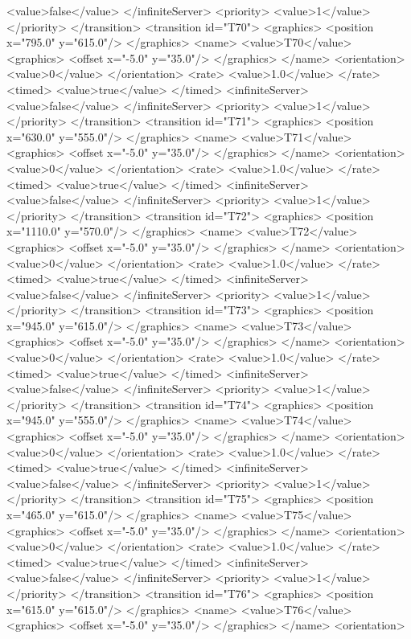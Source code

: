 <value>false</value>
</infiniteServer>
<priority>
<value>1</value>
</priority>
</transition>
<transition id="T70">
<graphics>
<position x="795.0" y="615.0"/>
</graphics>
<name>
<value>T70</value>
<graphics>
<offset x="-5.0" y="35.0"/>
</graphics>
</name>
<orientation>
<value>0</value>
</orientation>
<rate>
<value>1.0</value>
</rate>
<timed>
<value>true</value>
</timed>
<infiniteServer>
<value>false</value>
</infiniteServer>
<priority>
<value>1</value>
</priority>
</transition>
<transition id="T71">
<graphics>
<position x="630.0" y="555.0"/>
</graphics>
<name>
<value>T71</value>
<graphics>
<offset x="-5.0" y="35.0"/>
</graphics>
</name>
<orientation>
<value>0</value>
</orientation>
<rate>
<value>1.0</value>
</rate>
<timed>
<value>true</value>
</timed>
<infiniteServer>
<value>false</value>
</infiniteServer>
<priority>
<value>1</value>
</priority>
</transition>
<transition id="T72">
<graphics>
<position x="1110.0" y="570.0"/>
</graphics>
<name>
<value>T72</value>
<graphics>
<offset x="-5.0" y="35.0"/>
</graphics>
</name>
<orientation>
<value>0</value>
</orientation>
<rate>
<value>1.0</value>
</rate>
<timed>
<value>true</value>
</timed>
<infiniteServer>
<value>false</value>
</infiniteServer>
<priority>
<value>1</value>
</priority>
</transition>
<transition id="T73">
<graphics>
<position x="945.0" y="615.0"/>
</graphics>
<name>
<value>T73</value>
<graphics>
<offset x="-5.0" y="35.0"/>
</graphics>
</name>
<orientation>
<value>0</value>
</orientation>
<rate>
<value>1.0</value>
</rate>
<timed>
<value>true</value>
</timed>
<infiniteServer>
<value>false</value>
</infiniteServer>
<priority>
<value>1</value>
</priority>
</transition>
<transition id="T74">
<graphics>
<position x="945.0" y="555.0"/>
</graphics>
<name>
<value>T74</value>
<graphics>
<offset x="-5.0" y="35.0"/>
</graphics>
</name>
<orientation>
<value>0</value>
</orientation>
<rate>
<value>1.0</value>
</rate>
<timed>
<value>true</value>
</timed>
<infiniteServer>
<value>false</value>
</infiniteServer>
<priority>
<value>1</value>
</priority>
</transition>
<transition id="T75">
<graphics>
<position x="465.0" y="615.0"/>
</graphics>
<name>
<value>T75</value>
<graphics>
<offset x="-5.0" y="35.0"/>
</graphics>
</name>
<orientation>
<value>0</value>
</orientation>
<rate>
<value>1.0</value>
</rate>
<timed>
<value>true</value>
</timed>
<infiniteServer>
<value>false</value>
</infiniteServer>
<priority>
<value>1</value>
</priority>
</transition>
<transition id="T76">
<graphics>
<position x="615.0" y="615.0"/>
</graphics>
<name>
<value>T76</value>
<graphics>
<offset x="-5.0" y="35.0"/>
</graphics>
</name>
<orientation>
